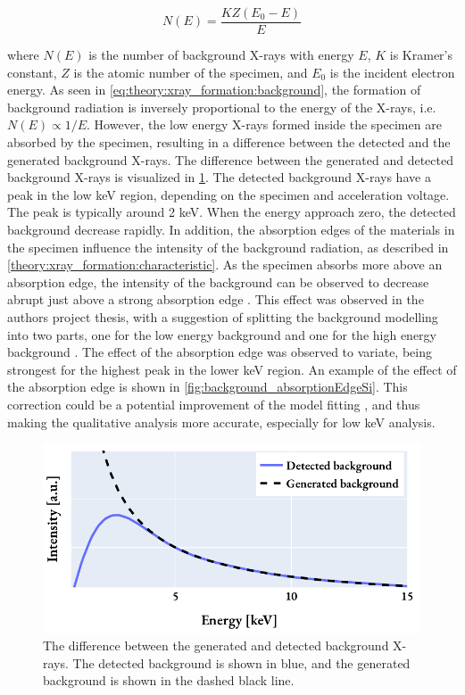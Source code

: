 \begin{equation}
    \label{eq:theory:xray_formation:background}
    N(E) = \frac{K Z (E_0-E)}{E}
\end{equation}

where $N(E)$ is the number of background X-rays with energy $E$, $K$ is Kramer's constant, $Z$ is the atomic number of the specimen, and $E_0$ is the incident electron energy.
As seen in \cref{eq:theory:xray_formation:background}, the formation of background radiation is inversely proportional to the energy of the X-rays, i.e. $N(E) \propto 1/E$.
However, the low energy X-rays formed inside the specimen are absorbed by the specimen, resulting in a difference between the detected and the generated background X-rays.
The difference between the generated and detected background X-rays is visualized in \cref{fig:background_xrays}.
The detected background X-rays have a peak in the low keV region, depending on the specimen and acceleration voltage.
The peak is typically around 2 keV.
When the energy approach zero, the detected background decrease rapidly.
In addition, the absorption edges of the materials in the specimen influence the intensity of the background radiation, as described in \cref{theory:xray_formation:characteristic}.
As the specimen absorbs more above an absorption edge, the intensity of the background can be observed to decrease abrupt just above a strong absorption edge \cite[p. 59]{goldstein_scanning_2018}.
This effect was observed in the authors project thesis, with a suggestion of splitting the background modelling into two parts, one for the low energy background and one for the high energy background \cite{project_report}.
The effect of the absorption edge was observed to variate, being strongest for the highest peak in the lower keV region.
An example of the effect of the absorption edge is shown in \cref{fig:background_absorptionEdgeSi}.
This correction could be a potential improvement of the model fitting \cite{hyperspy_1.7.1,nilsen_factorless_2021}, and thus making the qualitative analysis more accurate, especially for low keV analysis.


\begin{figure}[pht]
    \centering
    \includegraphics[width=0.8\linewidth]{figures/background_generated_detected.pdf}
    \caption{
        The difference between the generated and detected background X-rays.
        The detected background is shown in blue, and the generated background is shown in the dashed black line.
    }
    \label{fig:background_xrays}
\end{figure}

